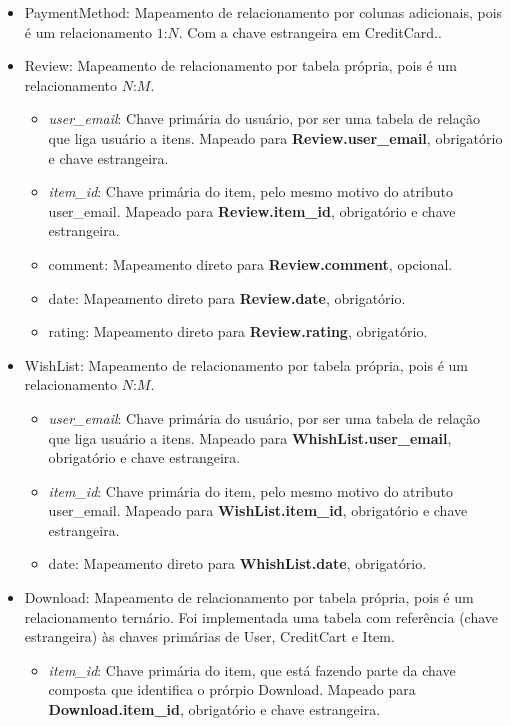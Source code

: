 \documentclass[a4paper, 11pt]{article}
\begin{document}
\begin{itemize}
    \item PaymentMethod: Mapeamento de relacionamento por colunas adicionais, pois é um relacionamento $1$:$N$. Com a chave estrangeira em CreditCard..
    \item Review: Mapeamento de relacionamento por tabela própria, pois é um relacionamento $N$:$M$.
    \begin{itemize}
        \item {\textit{user\_email}}: Chave primária do usuário, por ser uma tabela de relação que liga usuário a itens. Mapeado para {\textbf{Review.user\_email}}, obrigatório e chave estrangeira.
        \item {\textit{item\_id}}: Chave primária do item, pelo mesmo motivo do atributo user\_email. Mapeado para {\textbf{Review.item\_id}}, obrigatório e chave estrangeira.
        \item comment: Mapeamento direto para {\textbf{Review.comment}}, opcional.
        \item date: Mapeamento direto para {\textbf{Review.date}}, obrigatório.
        \item rating: Mapeamento direto para {\textbf{Review.rating}}, obrigatório.
    \end{itemize}
    \item WishList: Mapeamento de relacionamento por tabela própria, pois é um relacionamento $N$:$M$. 
    \begin{itemize}
        \item {\textit{user\_email}}: Chave primária do usuário, por ser uma tabela de relação que liga usuário a itens. Mapeado para {\textbf{WhishList.user\_email}}, obrigatório e chave estrangeira.
        \item {\textit{item\_id}}: Chave primária do item, pelo mesmo motivo do atributo user\_email. Mapeado para {\textbf{WishList.item\_id}}, obrigatório e chave estrangeira.
        \item date: Mapeamento direto para  {\textbf{WhishList.date}}, obrigatório.
    \end{itemize}
    \item Download: Mapeamento de relacionamento por tabela própria, pois é um relacionamento ternário. Foi implementada uma tabela com referência (chave estrangeira) às chaves primárias de User, CreditCart e Item.
    \begin{itemize}
        \item {\textit{item\_id}}: Chave primária do item, que está fazendo parte da chave composta que identifica o prórpio Download. Mapeado para {\textbf{Download.item\_id}}, obrigatório e chave estrangeira.

\end{itemize}
\end{itemize}
\end{document}
